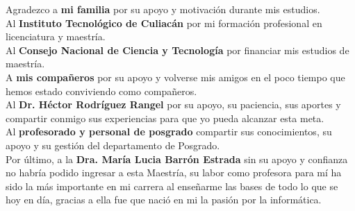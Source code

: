

\begin{spacing}{1.8}

\noindent Agradezco a \textbf{mi familia} por su apoyo y motivación durante mis estudios.
\\
\noindent Al \textbf{Instituto Tecnológico de Culiacán} por mi formación profesional en licenciatura y maestría.
\\
\noindent Al \textbf{Consejo Nacional de Ciencia y Tecnología} por financiar mis estudios de maestría.
\\
\noindent A \textbf{mis compañeros} por su apoyo y volverse mis amigos en el poco tiempo que hemos estado conviviendo como compañeros.
\\
\noindent Al \textbf{Dr. Héctor Rodríguez Rangel} por su apoyo, su paciencia, sus aportes y compartir conmigo sus experiencias para que yo pueda alcanzar esta meta.
\\
\noindent Al \textbf{profesorado y personal de posgrado} compartir sus conocimientos, su apoyo y su gestión del departamento de Posgrado.
\\
\noindent Por último, a la \textbf{Dra. María Lucia Barrón Estrada} sin su apoyo y confianza no habría podido ingresar a esta Maestría, su labor como profesora para mí ha sido la más importante en mi carrera al enseñarme las bases de todo lo que se hoy en día, gracias a ella fue que nació en mi la pasión por la informática.

\end{spacing} 